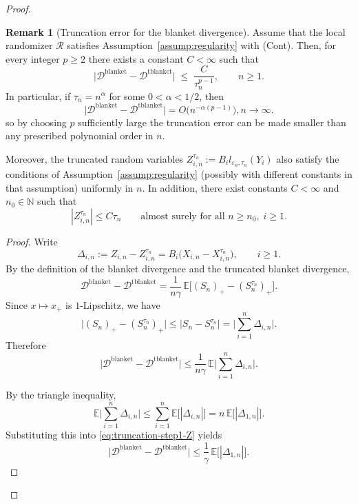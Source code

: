 \documentclass{article}
\theoremstyle{plain}
\theoremstyle{definition}
\newtheorem{lemma}[theorem]{Remark}
\begin{document}
\begin{proof}
\begin{lemma}[Truncation error for the blanket divergence]
\label{lem:truncation-blanket}
Assume that the local randomizer $\mathcal R$ satisfies
Assumption~\ref{assump:regularity} with (Cont).
Then, for every integer $p\ge 2$ there exists a constant
$C<\infty$ such that
\begin{equation}
  \label{eq:truncation-error-basic}
  \bigl|\mathcal D^{\mathrm{blanket}}
        -\mathcal D^{\mathrm{tblanket}}\bigr|
  \;\le\;
  \frac{C}{\tau_n^{p-1}},
  \qquad n\ge 1.
\end{equation}
In particular, if $\tau_n = n^\alpha$ for some $0<\alpha<1/2$, then
\[
  \bigl|\mathcal D^{\mathrm{blanket}}
        -\mathcal D^{\mathrm{tblanket}}\bigr|
  = O\bigl(n^{-\alpha(p-1)}\bigr), n\to\infty.
\]
so by choosing $p$ sufficiently large the truncation error can be made
smaller than any prescribed polynomial order in $n$.

Moreover, the truncated random variables
$Z_{i,n}^{\tau_n} := B_i l_{\varepsilon_n,\tau_n}(Y_i)$ also satisfy
the conditions of Assumption~\ref{assump:regularity} (possibly with different constants
in that assumption) uniformly in $n$.
In addition, there exist constants $C<\infty$ and $n_0\in\mathbb N$ such that
\[
  |Z_{i,n}^{\tau_n}|
  \le C \tau_n \qquad \text{almost surely for all }n\ge n_0,\; i\ge 1.
\]
\end{lemma}



\begin{proof}
Write
\[
  \Delta_{i,n} := Z_{i,n} - Z_{i,n}^{\tau_n}
  = B_i\bigl(X_{i,n} - X_{i,n}^{\tau_n}\bigr), \qquad i\ge 1.
\]
By the definition of the blanket divergence and the truncated blanket divergence,
\[
  \mathcal D^{\mathrm{blanket}}
  - \mathcal D^{\mathrm{tblanket}}
  = \frac{1}{n\gamma}\,
    \mathbb E\bigl[(S_n)_+ - (S_n^{\tau_n})_+\bigr].
\]
Since $x\mapsto x_+$ is $1$-Lipschitz, we have
\[
  \bigl|(S_n)_+ - (S_n^{\tau_n})_+\bigr|
  \le \bigl|S_n - S_n^{\tau_n}\bigr|
  = \biggl|\sum_{i=1}^n \Delta_{i,n}\biggr|.
\]
Therefore
\begin{equation}
  \label{eq:truncation-step1-Z}
  \bigl|\mathcal D^{\mathrm{blanket}}
        - \mathcal D^{\mathrm{tblanket}}\bigr|
  \le \frac{1}{n\gamma}\,
       \mathbb E\biggl|\sum_{i=1}^n \Delta_{i,n}\biggr|.
\end{equation}

By the triangle inequality,
\[
  \mathbb E\biggl|\sum_{i=1}^n \Delta_{i,n}\biggr|
  \le \sum_{i=1}^n \mathbb E\bigl[|\Delta_{i,n}|\bigr]
  = n\,\mathbb E\bigl[|\Delta_{1,n}|\bigr].
\]
Substituting this into \eqref{eq:truncation-step1-Z} yields
\[
  \bigl|\mathcal D^{\mathrm{blanket}}
        - \mathcal D^{\mathrm{tblanket}}\bigr|
  \le \frac{1}{\gamma}\,\mathbb E\bigl[|\Delta_{1,n}|\bigr].
\]


\end{proof}
\end{proof}
\end{document}
